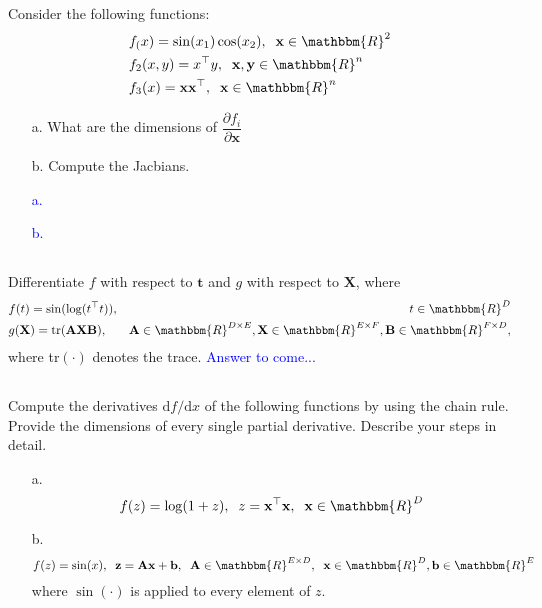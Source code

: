 \documentclass[a4paper,12pt]{article}
\newcommand{\R}{\mathbbm{R}}
\newcommand{\vecx}{\textbf{x}}
\newcommand{\vecy}{\textbf{y}}
\newcommand{\vecz}{\textbf{z}}
\newcommand{\vecb}{\textbf{b}}
\newcommand{\matA}{\textbf{A}}
\newcommand{\matB}{\textbf{B}}
\begin{document}
\subsection{}
Consider the following functions:
\begin{align*}
& f_(x) = \sin(x_1)\cos(x_2), \;\; \vecx \in \R^2 \\
& f_2(x,y) = x^\top y, \;\; \vecx, \vecy \in \R^n \\
& f_3(x) = \vecx \vecx^\top, \;\; \vecx \in \R^n
\end{align*}
\begin{itemize}
 \item [a.] What are the dimensions of $\dfrac{\partial f_i}{\partial \vecx}$
 \item [b.] Compute the Jacbians.
\end{itemize}
\textcolor{blue}{
\begin{itemize}
 \item [a.]
 \item [b.]
\end{itemize}
}
\subsection{}
Differentiate $f$ with respect to $\textbf{t}$ and $g$ with respect to $\textbf{X}$, where
\begin{align*}
& f(t)=\sin(\log(t^\top t)), & t \in \R^D \\
& g(\textbf{X}) = \textrm{tr}(\matA \textbf{X} \matB), & \matA \in \R^{D \times E}, \textbf{X} \in \R^{E \times F}, \matB \in \R^{F \times D},
\end{align*}
where tr$(\cdot)$ denotes the trace.
\textcolor{blue}{
Answer to come...
}
\subsection{}
Compute the derivatives $\textrm{d}f/\textrm{d}x$ of the following functions by using the chain rule. Provide the dimensions of every single partial derivative. Describe your steps in detail.
\begin{itemize}
 \item [a.] $$f(z) = \log(1+z), \;\; z = \vecx^\top \vecx, \;\; \vecx \in \R^D$$
 \item [b.] $$f(z) = \sin(x), \;\; \vecz = \matA \vecx + \vecb, \;\; \matA \in \R^{E \times D}, \;\; \vecx \in \R^D, \vecb \in \R^E$$
 where $\sin(\cdot)$ is applied to every element of $z$.
\end{itemize}
\end{document}
